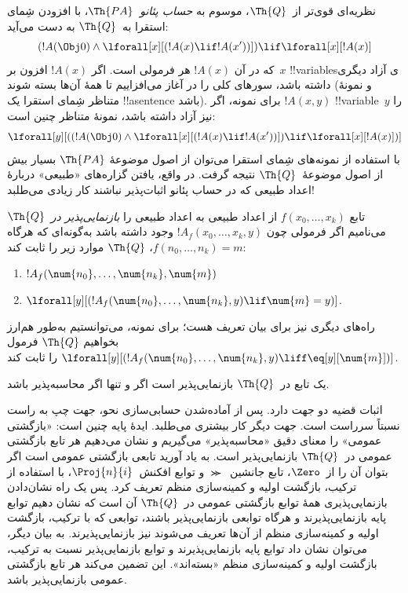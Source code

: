 \documentclass[../../../include/open-logic-section]{subfiles}
\begin{document}
نظریه‌ای قوی‌تر از~$\Th{Q}$، موسوم به \emph{حساب پئانو}~$\Th{PA}$،
با افزودن شِمای استقرا به~$\Th{Q}$ به دست می‌آید:
\[
(!A(\Obj 0) \land \lforall[x][(!A(x) \lif !A(x'))]) \lif \lforall[x][!A(x)]
\]
که در آن $!A(x)$ هر فرمولی است. اگر $!A(x)$ افزون بر~$x$ !!{variable}sی
آزاد دیگری داشته باشد، سورهای کلی را در آغاز می‌افزاییم تا همهٔ آن‌ها
بسته شوند (و نمونهٔ متناظر شِمای استقرا یک !!a{sentence} باشد). برای نمونه،
اگر $!A(x,y)$ !!{variable}~$y$ را نیز آزاد داشته باشد، نمونهٔ متناظر چنین
است:
\[
\lforall[y][((!A(\Obj 0) \land \lforall[x][(!A(x) \lif !A(x'))]) \lif
  \lforall[x][!A(x)])]
\]
با استفاده از نمونه‌های شِمای استقرا می‌توان از اصول موضوعهٔ
$\Th{PA}$ بسیار بیش از اصول موضوعهٔ~$\Th{Q}$ نتیجه گرفت. در واقع،
یافتن گزاره‌های «طبیعی» دربارهٔ اعداد طبیعی که در حساب پئانو اثبات‌پذیر
نباشند کار زیادی می‌طلبد!{}

\begin{defn}
  تابع $f(x_0,\ldots,x_k)$ از اعداد طبیعی به اعداد طبیعی را
  {\em بازنمایی‌پذیر در~$\Th{Q}$} می‌نامیم اگر فرمولی چون
  $!A_f(x_0,\dots,x_k,y)$ وجود داشته باشد به‌گونه‌ای که هرگاه
  $f(n_0,\dots,n_k)=m$، $\Th{Q}$ موارد زیر را ثابت کند:
\begin{enumerate}
\item{} $!A_f(\num{n_0}, \dots, \num{n_k}, \num{m})$
\item{} $\lforall[y][(!A_f(\num{n_0}, \dots,
\num{n_k}, y) \lif \num{m} = y)]$.
\end{enumerate}
\end{defn}

راه‌های دیگری نیز برای بیان تعریف هست؛ برای نمونه، می‌توانستیم به‌طور
هم‌ارز بخواهیم $\Th{Q}$ فرمول
$\lforall[y][(!A_f(\num{n_0},\dots,\num{n_k},y)
\liff\eq[y][\num{m}])]$ را ثابت کند.

\begin{thm}
یک تابع در~$\Th{Q}$ بازنمایی‌پذیر است اگر و تنها اگر محاسبه‌پذیر باشد.
\end{thm}

اثبات قضیه دو جهت دارد. پس از آماده‌شدن حسابی‌سازی نحو، جهت چپ به
راست نسبتاً سرراست است. جهت دیگر کار بیشتری می‌طلبد. ایدهٔ پایه چنین
است: «بازگشتی عمومی» را معنای دقیق «محاسبه‌پذیر» می‌گیریم و نشان
می‌دهیم هر تابع بازگشتی عمومی در~$\Th{Q}$ بازنمایی‌پذیر است. به یاد
آورید تابعی بازگشتی عمومی است اگر بتوان آن را از~$\Zero$، تابع
جانشین~$\Succ$ و توابع افکنش~$\Proj{n}{i}$، با استفاده از ترکیب،
بازگشت اولیه و کمینه‌سازی منظم تعریف کرد. پس یک راه نشان‌دادن
بازنمایی‌پذیری همهٔ توابع بازگشتی عمومی در~$\Th{Q}$ آن است که نشان
دهیم توابع پایه بازنمایی‌پذیرند و هرگاه توابعی بازنمایی‌پذیر باشند،
توابعی که با ترکیب، بازگشت اولیه و کمینه‌سازی منظم از آن‌ها تعریف
می‌شوند نیز بازنمایی‌پذیرند. به بیان دیگر، می‌توان نشان داد توابع پایه
بازنمایی‌پذیرند و توابع بازنمایی‌پذیر نسبت به ترکیب، بازگشت اولیه و
کمینه‌سازی منظم «بسته‌اند». این تضمین می‌کند هر تابع بازگشتی عمومی
بازنمایی‌پذیر باشد.
\end{document}
